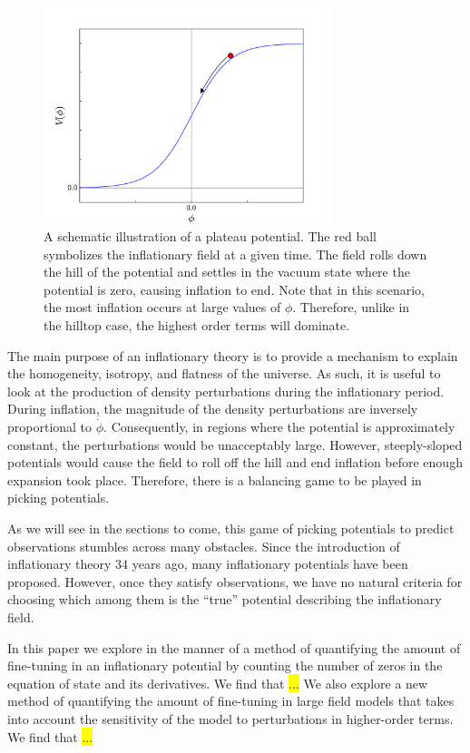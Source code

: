 \documentclass[a4paper,11pt]{article}
\newcommand{\hl}[1]{\colorbox{yellow}{#1}}
\begin{document}
\begin{figure}[h]
	\centering
	\includegraphics[width=0.75\textwidth]{figures/plateau_cartoon.pdf}
	\caption[Schematic illustration of a Plateau Model]{A schematic illustration of a plateau potential. The red ball symbolizes the inflationary field at a given time. The field rolls down the hill of the potential and settles in the vacuum state where the potential is zero, causing inflation to end. Note that in this scenario, the most inflation occurs at large values of $\phi$. Therefore, unlike in the hilltop case, the highest order terms will dominate.}
	\label{fig:PlateauCartoon}
\end{figure}

The main purpose of an inflationary theory is to provide a mechanism to explain the homogeneity, isotropy, and flatness of the universe. As such, it is useful to look at the production of density perturbations during the inflationary period. During inflation, the magnitude of the density perturbations are inversely proportional to $\dot \phi$. Consequently, in regions where the potential is approximately constant, the perturbations would be unacceptably large. However, steeply-sloped potentials would cause the field to roll off the hill and end inflation before enough expansion took place. Therefore, there is a balancing game to be played in picking potentials. 

As we will see in the sections to come, this game of picking potentials to predict observations stumbles across many obstacles. Since the introduction of inflationary theory 34 years ago, many inflationary potentials have been proposed. However, once they satisfy observations, we have no natural criteria for choosing which among them is the ``true'' potential describing the inflationary field. 

In this paper we explore in the manner of \citet{Boyle+2006} a method of quantifying the amount of fine-tuning in an inflationary potential by counting the number of zeros in the equation of state and its derivatives. We find that \hl{...} We also explore a new method of quantifying the amount of fine-tuning in large field models that takes into account the sensitivity of the model to perturbations in higher-order terms. We find that \hl{...}
\end{document}
